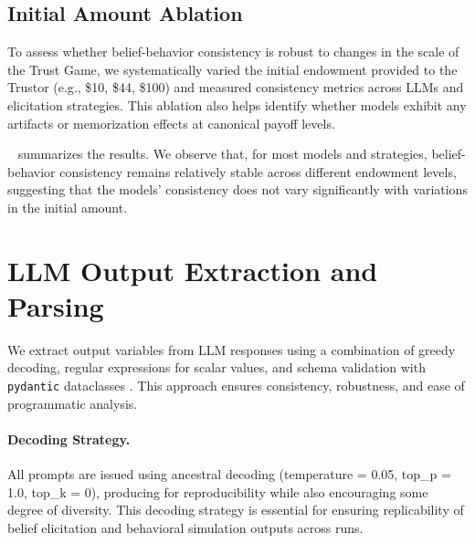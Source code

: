 \documentclass{article} %
\begin{document}
\begin{appendices}
\subsection{Initial Amount Ablation}
\label{app:ablation_amount}

To assess whether belief-behavior consistency is robust to changes in the scale of the Trust Game, we systematically varied the initial endowment provided to the Trustor (e.g., \$10, \$44, \$100) and measured consistency metrics across LLMs and elicitation strategies. This ablation also helps identify whether models exhibit any artifacts or memorization effects at canonical payoff levels. 

~ summarizes the results. We observe that, for most models and strategies, belief-behavior consistency remains relatively stable across different endowment levels, suggesting that the models' consistency does not vary significantly with variations in the initial amount.








\section{LLM Output Extraction and Parsing}
\label{app:output-extraction}

We extract output variables from LLM responses using a combination of greedy decoding, regular expressions for scalar values, and schema validation with \texttt{pydantic} dataclasses \citep{Colvin_Pydantic_2025}. This approach ensures consistency, robustness, and ease of programmatic analysis.

\paragraph{Decoding Strategy.}
All prompts are issued using ancestral decoding (temperature = 0.05, top\_p = 1.0, top\_k = 0), producing for reproducibility while also encouraging some degree of diversity. This decoding strategy is essential for ensuring replicability of belief elicitation and behavioral simulation outputs across runs.


\end{appendices}
\end{document}
